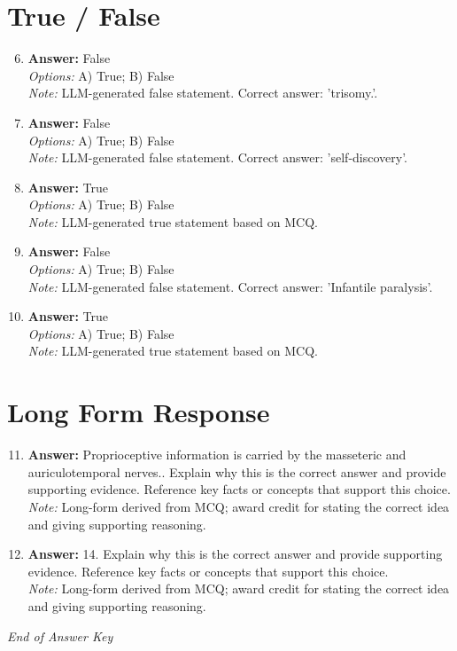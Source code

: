 \documentclass[12pt]{article}
\begin{document}
\section*{True / False}
\begin{enumerate}[label=\arabic*.]
\setcounter{enumi}{5}
\item \textbf{Answer:} False
\\ \textit{Options:} A) True; B) False
\\ \textit{Note:} LLM-generated false statement. Correct answer: 'trisomy.'.
\item \textbf{Answer:} False
\\ \textit{Options:} A) True; B) False
\\ \textit{Note:} LLM-generated false statement. Correct answer: 'self-discovery'.
\item \textbf{Answer:} True
\\ \textit{Options:} A) True; B) False
\\ \textit{Note:} LLM-generated true statement based on MCQ.
\item \textbf{Answer:} False
\\ \textit{Options:} A) True; B) False
\\ \textit{Note:} LLM-generated false statement. Correct answer: 'Infantile paralysis'.
\item \textbf{Answer:} True
\\ \textit{Options:} A) True; B) False
\\ \textit{Note:} LLM-generated true statement based on MCQ.
\end{enumerate}

\section*{Long Form Response}
\begin{enumerate}[label=\arabic*.]
\setcounter{enumi}{10}
\item \textbf{Answer:} Proprioceptive information is carried by the masseteric and auriculotemporal nerves.. Explain why this is the correct answer and provide supporting evidence. Reference key facts or concepts that support this choice.
\\ \textit{Note:} Long-form derived from MCQ; award credit for stating the correct idea and giving supporting reasoning.
\item \textbf{Answer:} 14. Explain why this is the correct answer and provide supporting evidence. Reference key facts or concepts that support this choice.
\\ \textit{Note:} Long-form derived from MCQ; award credit for stating the correct idea and giving supporting reasoning.
\end{enumerate}

\vfill
\noindent\textit{End of Answer Key}
\end{document}
